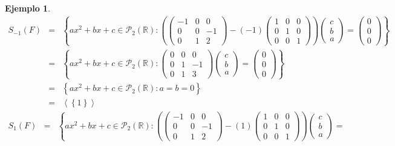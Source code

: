\documentclass[12pt]{book}
\newtheorem{ejem}{Ejemplo}
\def\R{\mathbb{R}}
\def\P{\mathcal{P}}
\begin{document}
\begin{ejem}
{\begin{eqnarray*}
S_{-1}(F)&=&\left\{ ax^2+bx+c\in\P_2(\R) : 
\left(\left(\begin{array}{ccc} -1 & 0 & 0 \\ 0 & 0 & -1 \\ 0 & 1 &2  \end{array}\right) - (-1)\left(\begin{array}{ccc} 1 & 0 & 0 \\ 0 & 1 & 0 \\ 0 & 0 & 1 \end{array}\right)\right)\left(\begin{array}{c} c  \\ b \\ a  \end{array}\right)=
\left(\begin{array}{c} 0 \\ 0 \\ 0  \end{array}\right)\right\}\\
&=&\left\{ ax^2+bx+c\in\P_2(\R) : 
\left(\begin{array}{ccc} 0 & 0 & 0 \\ 0 & 1 & -1 \\ 0 & 1 &3  \end{array}\right)\left(\begin{array}{c} c  \\ b \\ a  \end{array}\right)=
\left(\begin{array}{c} 0 \\ 0 \\ 0  \end{array}\right)\right\}\\
&=&\left\{ ax^2+bx+c\in\P_2(\R) : a=b=0\right\}\\
&=&\left\langle\left\{1\right\}\right\rangle
\end{eqnarray*}
\begin{eqnarray*}
S_{1}(F)&=&\left\{ ax^2+bx+c\in\P_2(\R) : 
\left(\left(\begin{array}{ccc} -1 & 0 & 0 \\ 0 & 0 & -1 \\ 0 & 1 &2  \end{array}\right) - (1)\left(\begin{array}{ccc} 1 & 0 & 0 \\ 0 & 1 & 0 \\ 0 & 0 & 1 \end{array}\right)\right)\left(\begin{array}{c} c  \\ b \\ a  \end{array}\right)=

\end{eqnarray*}}
\end{ejem}
\end{document}
